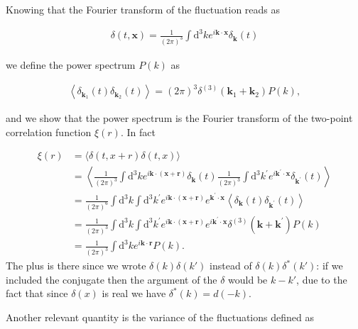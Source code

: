 Knowing that the Fourier transform of the fluctuation reads as

\begin{align}
    \delta(t, \mathbf{x})=\frac{1}{(2 \pi)^{3}} \int \mathrm{d}^{3} k e^{i \mathbf{k} \cdot \mathbf{x}} \delta_{\mathbf{k}}(t) \label{2.112}
\end{align}



we define the power spectrum $P(k)$ as

\begin{align}
    \left\langle\delta_{\mathbf{k}_{1}}(t) \delta_{\mathbf{k}_{2}}(t)\right\rangle=(2 \pi)^{3} \delta^{(3)}\left(\mathbf{k}_{1}+\mathbf{k}_{2}\right) P(k), \label{2.113}
\end{align}



and we show that the power spectrum is the Fourier transform of the two-point correlation function $\xi(r)$. In fact


\begin{align}
    \xi(r) & =\langle\delta(t, x+r) \delta(t, x)\rangle \\
    & =\left\langle\frac{1}{(2 \pi)^{3}} \int \mathrm{d}^{3} k e^{i \mathbf{k} \cdot(\mathbf{x}+\mathbf{r})} \delta_{\mathbf{k}}(t) \frac{1}{(2 \pi)^{3}} \int \mathrm{d}^{3} k^{\prime} e^{i \mathbf{k}^{\prime} \cdot \mathbf{x}} \delta_{\mathbf{k}^{\prime}}(t)\right\rangle \\
    & =\frac{1}{(2 \pi)^{6}} \int \mathrm{d}^{3} k \int \mathrm{d}^{3} k^{\prime} e^{i \mathbf{k} \cdot(\mathbf{x}+\mathbf{r})} e^{\mathbf{k}^{\prime} \cdot \mathbf{x}}\left\langle\delta_{\mathbf{k}}(t) \delta_{\mathbf{k}^{\prime}}(t)\right\rangle \\
    & =\frac{1}{(2 \pi)^{3}} \int \mathrm{d}^{3} k \int \mathrm{d}^{3} k^{\prime} e^{i \mathbf{k} \cdot(\mathbf{x}+\mathbf{r})} e^{i \mathbf{k}^{\prime} \cdot \mathbf{x}} \delta^{(3)}\left(\mathbf{k}+\mathbf{k}^{\prime}\right) P(k) \\
    & =\frac{1}{(2 \pi)^{3}} \int \mathrm{d}^{3} k e^{i \mathbf{k} \cdot \mathbf{r}} P(k) . \label{2.118}
\end{align}
The plus is there since we wrote $\delta(k)\delta(k')$ instead of $\delta(k)\delta^*(k')$: if we included the conjugate then the argument of the $\delta$ would be $k-k'$, due to the fact that since $\delta(x)$ is real we have $\delta^*(k) = d(-k)$.

Another relevant quantity is the variance of the fluctuations defined as

